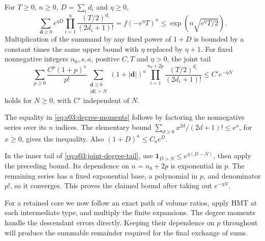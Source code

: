 \begin{lmm}
\label{lmm:s03:degree-moments}
For $T\geq0$, $n\geq0$, $D=\sum_i d_i$ and $\eta\geq0$,
\begin{equation}
\label{eq:s03:degree-moments}
\sum_{\mathbf d\geq0}e^{\eta D}
 \prod_{i=1}^n\frac{(T/2)^{d_i}}{(2d_i+1)!}
=f(-e^\eta T)^n
\leq\exp\left(n\sqrt{e^\eta T/2}\right).
\end{equation}
Multiplication of the summand by any fixed power of $1+D$ is
bounded by a constant times the same upper bound with $\eta$
replaced by $\eta+1$.
For fixed nonnegative integers $n_0,s,a$, positive $C,T$ and
$\eta>0$, the joint tail
\begin{equation}
\label{eq:s03:joint-degree-tail}
\sum_{p\geq0}\frac{C^p(1+p)^s}{p!}
 \sum_{\substack{\mathbf d\geq0\\|\mathbf d|>N}}
 (1+|\mathbf d|)^a
 \prod_{i=1}^{n_0+2p}\frac{(T/2)^{d_i}}{(2d_i+1)!}
\leq C' e^{-\eta N}
\end{equation}
holds for $N\geq0$, with $C'$ independent of $N$.
\end{lmm}
\begin{prf}
The equality in \eqref{eq:s03:degree-moments} follows by factoring
the nonnegative series over its $n$ indices. The elementary bound
$\sum_{d\geq0}x^{2d}/(2d+1)!\leq e^x$, for $x\geq0$, gives the
inequality. Also $(1+D)^a\leq C_a e^D$.

In the inner tail of \eqref{eq:s03:joint-degree-tail}, use
$\mathbf1_{D>N}\leq e^{\eta(D-N)}$, then apply the preceding
bound. Its dependence on $n=n_0+2p$ is exponential in $p$.
The remaining series has a fixed exponential base, a polynomial
in $p$, and denominator $p!$, so it converges. This proves the
claimed bound after taking out $e^{-\eta N}$.
\end{prf}

For a retained core we now follow an exact path of volume ratios,
apply HMT at each intermediate type, and multiply the finite
expansions. The degree moments handle the descendant errors directly.
Keeping their dependence on $p$ throughout will produce the summable
remainder required for the final exchange of sums.

